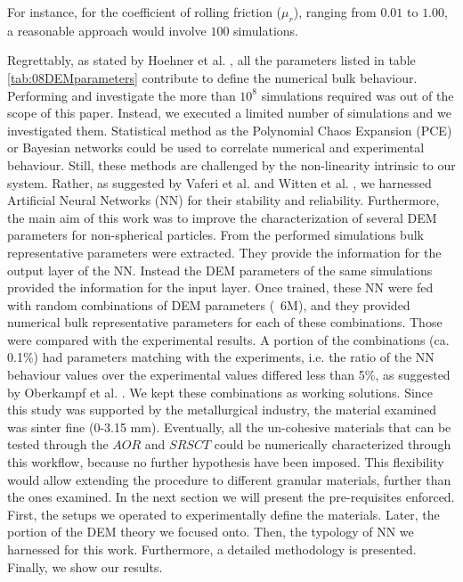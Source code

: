 For instance, for the coefficient of rolling friction ($\mu_r$), ranging from
$0.01$ to $1.00$, a reasonable approach would involve $100$ simulations.

Regrettably, as stated by Hoehner et al. \cite{RefWorks:86}, all the parameters listed in table \ref{tab:08DEMparameters}
contribute to define the numerical bulk behaviour. Performing and investigate the 
more than $10^8$ simulations required was out of the scope of this paper.
Instead, we executed a limited number of simulations and we investigated them. 
Statistical method as the Polynomial Chaos Expansion (PCE) or Bayesian networks 
could be used to correlate numerical and experimental behaviour. 
Still, these methods are challenged by the non-linearity intrinsic to our system. 
Rather, as suggested by Vaferi et al. \cite{RefWorks:150} and Witten et al.
\cite{RefWorks:174}, we harnessed Artificial Neural Networks (NN) for their stability and reliability.
Furthermore, the main aim of this work was to improve the characterization 
of several DEM parameters for non-spherical particles. 
From the performed simulations bulk representative parameters were extracted. 
They provide the information for the output layer of the NN. Instead the DEM 
parameters of the same simulations provided the information for the input layer. 
Once trained, these NN were fed with random combinations of DEM parameters (~6M), 
and they provided numerical bulk representative parameters for each of these combinations. 
Those were compared with the experimental results. A portion of the combinations
(ca. 0.1\%)
had parameters matching with the experiments, i.e. the ratio of the NN behaviour
values over the experimental values differed less than 5\%, as suggested by Oberkampf et al. \cite{RefWorks:160}. 
We kept these combinations as working solutions.
Since this study was supported by the metallurgical industry, the material examined was  sinter fine (0-3.15 mm).
Eventually, all the un-cohesive materials that can be tested through the $AOR$
and $SRSCT$ could be numerically characterized through this workflow, because no
further hypothesis have been imposed.
This flexibility would allow extending the procedure to different granular materials, further than the ones examined.
In the next section we will present the pre-requisites enforced. 
First, the setups we operated to experimentally define the materials. 
Later, the portion of the DEM theory we focused onto. 
Then, the typology of NN we harnessed for this work. 
Furthermore, a detailed methodology is presented. Finally, we show our results.
